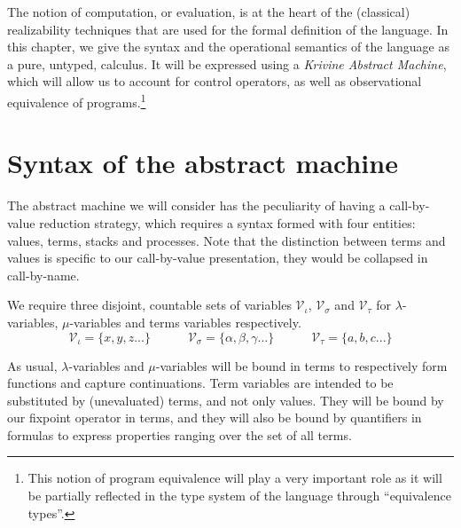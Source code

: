 The notion of computation, or evaluation, is at the heart of the (classical)
realizability techniques that are used for the formal definition of the \pml
language. In this chapter, we give the syntax and the operational semantics
of the language as a pure, untyped, calculus. It will be expressed using a
\emph{Krivine Abstract Machine}, which will allow us to account for control
operators, as well as observational equivalence of programs.\footnote{This
notion of program equivalence will play a very important role as it will be
partially reflected in the type system of the language through ``equivalence
types''.}

\section{Syntax of the abstract machine}

The abstract machine we will consider has the peculiarity of having a
call-by-value reduction strategy, which requires a syntax formed with four
entities: values, terms, stacks and processes. Note that the distinction
between terms and values is specific to our call-by-value presentation, they
would be collapsed in call-by-name.
\begin{definition}[variables]
  We require three disjoint, countable sets of variables $\mathcal{V}_{ι}$,
  $\mathcal{V}_{σ}$ and $\mathcal{V}_{τ}$ for $λ$-variables, $μ$-variables
  and terms variables respectively.
  $$
    \mathcal{V}_{ι} = \{x, y, z ...\}
    \quad\quad\quad
    \mathcal{V}_{σ} = \{α, β, γ ...\}
    \quad\quad\quad
    \mathcal{V}_{τ} = \{a, b, c ...\}
  $$
\end{definition}
As usual, $λ$-variables and $μ$-variables will be bound in terms to
respectively form functions and capture continuations. Term variables
are intended to be substituted by (unevaluated) terms, and not only
values. They will be bound by our fixpoint operator in terms, and they
will also be bound by quantifiers in formulas to express properties
ranging over the set of all terms.

